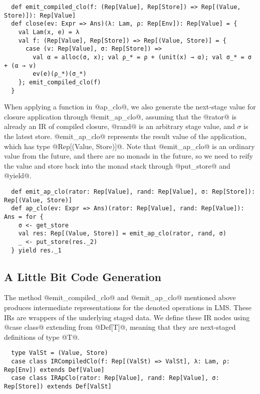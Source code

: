 \begin{lstlisting}
  def emit_compiled_clo(f: (Rep[Value], Rep[Store]) => Rep[(Value, Store)]): Rep[Value]
  def close(ev: Expr => Ans)(λ: Lam, ρ: Rep[Env]): Rep[Value] = {
    val Lam(x, e) = λ
    val f: (Rep[Value], Rep[Store]) => Rep[(Value, Store)] = {
      case (v: Rep[Value], σ: Rep[Store]) =>
        val α = alloc(σ, x); val ρ_* = ρ + (unit(x) → α); val σ_* = σ + (α → v)
        ev(e)(ρ_*)(σ_*)
    }; emit_compiled_clo(f)
  }
\end{lstlisting}

When applying a function in @ap_clo@, we also generate the next-stage value
for closure application through @emit_ap_clo@, assuming that the @rator@ is already an
IR of compiled closure, @rand@ is an arbitrary stage value, and $\sigma$ is the
latest store. @emit_ap_clo@ represents the result value of the application, which has type
@Rep[(Value, Store)]@. Note that @emit_ap_clo@ is an ordinary value from the
future, and there are no monads in the future, so we need to reify the value and
store back into the monad stack through @put_store@ and @yield@.

\begin{lstlisting}
  def emit_ap_clo(rator: Rep[Value], rand: Rep[Value], σ: Rep[Store]): Rep[(Value, Store)]
  def ap_clo(ev: Expr => Ans)(rator: Rep[Value], rand: Rep[Value]): Ans = for {
    σ <- get_store
    val res: Rep[(Value, Store)] = emit_ap_clo(rator, rand, σ)
    _ <- put_store(res._2)
  } yield res._1
\end{lstlisting}

\subsection{A Little Bit Code Generation}

The method @emit_compiled_clo@ and @emit_ap_clo@ mentioned above produces
intermediate representations for the denoted operations in LMS. These IRs are
wrappers of the underlying staged data. We define these IR nodes using
@case class@ extending from @Def[T]@, meaning that they are next-staged definitions of type @T@.

\begin{lstlisting}
  type ValSt = (Value, Store)
  case class IRCompiledClo(f: Rep[(ValSt) => ValSt], λ: Lam, ρ: Rep[Env]) extends Def[Value]
  case class IRApClo(rator: Rep[Value], rand: Rep[Value], σ: Rep[Store]) extends Def[ValSt]
\end{lstlisting}

